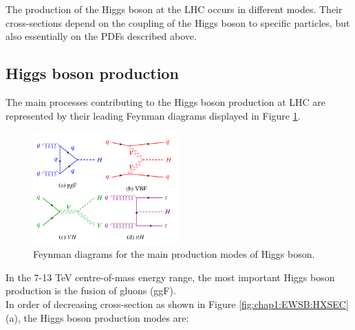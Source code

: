 The production of the Higgs boson at the LHC occurs in different modes. Their cross-sections depend on the coupling of the Higgs boson to specific particles, but also essentially on the PDFs described above.

\subsection{Higgs boson production}
\label{chap1:EWSB:HP}
The main processes contributing to the Higgs boson production at LHC are represented by their leading Feynman diagrams displayed in Figure \ref{fig:chap1:EWSB:HP}. 
\begin{figure}[htbp]
    \centering
    \includegraphics[width=0.5\textwidth]{Ch1/Img/Higgs_prod_modes.png}
    \caption{Feynman diagrams for the main production modes of Higgs boson.}
    \label{fig:chap1:EWSB:HP}
\end{figure}
In the 7-13 TeV centre-of-mass energy range, the most important Higgs boson production is the fusion of gluons (ggF).\\
In order of decreasing cross-section as shown in Figure \ref{fig:chap1:EWSB:HXSEC} (a), the Higgs boson production modes are:
